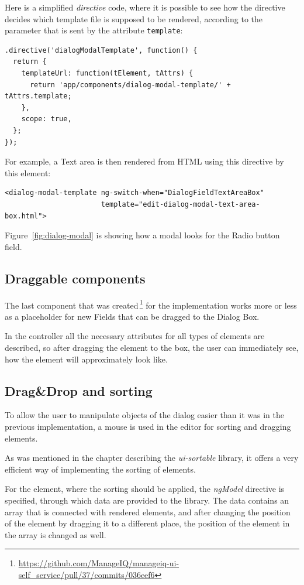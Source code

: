 Here is a simplified {\it directive} code, where it is possible to see how the
directive decides which template file is supposed to be rendered, according to
the parameter that is sent by the attribute {\tt template}:
\\
\begin{lstlisting}
.directive('dialogModalTemplate', function() {
  return {
    templateUrl: function(tElement, tAttrs) {
      return 'app/components/dialog-modal-template/' + tAttrs.template;
    },
    scope: true,
  };
});
\end{lstlisting}

For example, a Text area is then rendered from HTML using this directive by
this element:

\begin{lstlisting}
<dialog-modal-template ng-switch-when="DialogFieldTextAreaBox"
                       template="edit-dialog-modal-text-area-box.html">
\end{lstlisting}

Figure~\ref{fig:dialog-modal} is showing how a modal looks for the Radio
button field.

\subsection{Draggable components}

The last component that was
created\,\footnote{\url{https://github.com/ManageIQ/manageiq-ui-self_service/pull/37/commits/036eef6}}
for the implementation works more or less
as a placeholder for new Fields that can be dragged to the Dialog Box.

In the controller all the necessary attributes for all types of
elements are described, so after dragging the element to the box, the user can
immediately see, how the element will approximately look like.

\subsection{Drag\&Drop and sorting}

To allow the user to manipulate objects of the dialog easier than it was in
the previous implementation, a mouse is used in the editor for sorting and
dragging elements.

As was mentioned in the chapter describing the {\it ui-sortable} library, it
offers a very efficient way of implementing the sorting of elements.

For the element, where the sorting should be applied, the {\it ngModel}
directive is specified, through which data are provided to the library.
The data contains an array that is connected with rendered elements, and after
changing the position of the element by dragging it to a different place, the
position of the element in the array is changed as well.

